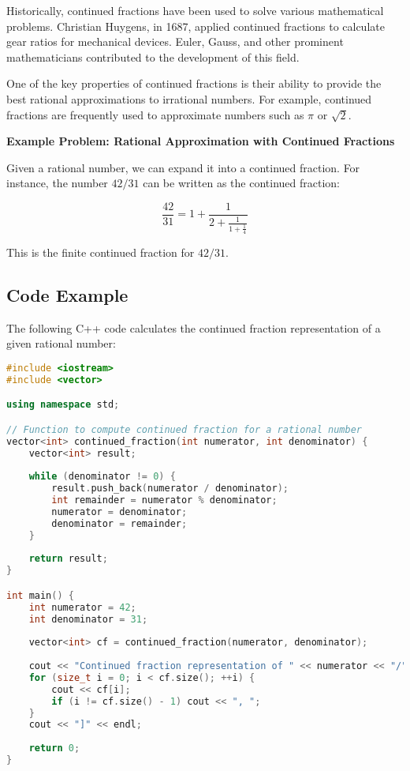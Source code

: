 \documentclass[10pt,a4paper]{article}
\begin{document}
Historically, continued fractions have been used to solve various mathematical problems. Christian Huygens, in 1687, applied continued fractions to calculate gear ratios for mechanical devices. Euler, Gauss, and other prominent mathematicians contributed to the development of this field.

One of the key properties of continued fractions is their ability to provide the best rational approximations to irrational numbers. For example, continued fractions are frequently used to approximate numbers such as \(\pi\) or \(\sqrt{2}\).

\textbf{Example Problem: Rational Approximation with Continued Fractions}

Given a rational number, we can expand it into a continued fraction. For instance, the number \(42/31\) can be written as the continued fraction:

\[
\frac{42}{31} = 1 + \frac{1}{2 + \frac{1}{1 + \frac{1}{4}}}
\]

This is the finite continued fraction for \(42/31\).

\subsection*{Code Example}

The following C++ code calculates the continued fraction representation of a given rational number:

\begin{lstlisting}[language=C++]
#include <iostream>
#include <vector>

using namespace std;

// Function to compute continued fraction for a rational number
vector<int> continued_fraction(int numerator, int denominator) {
    vector<int> result;
    
    while (denominator != 0) {
        result.push_back(numerator / denominator);
        int remainder = numerator % denominator;
        numerator = denominator;
        denominator = remainder;
    }
    
    return result;
}

int main() {
    int numerator = 42;
    int denominator = 31;
    
    vector<int> cf = continued_fraction(numerator, denominator);
    
    cout << "Continued fraction representation of " << numerator << "/" << denominator << " is: [";
    for (size_t i = 0; i < cf.size(); ++i) {
        cout << cf[i];
        if (i != cf.size() - 1) cout << ", ";
    }
    cout << "]" << endl;
    
    return 0;
}
\end{lstlisting}
\end{document}
